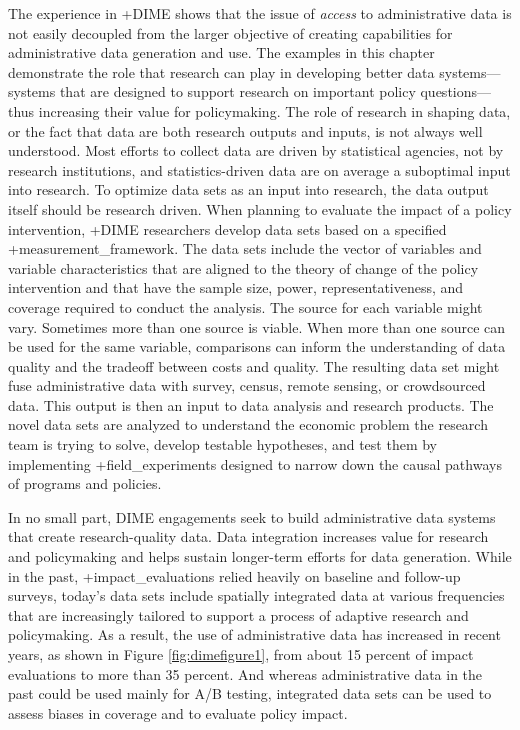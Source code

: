 \documentclass[
]{WileySix}
\begin{document}
The experience in +DIME\textbar{} shows that the issue of \emph{access} to administrative data is not easily decoupled from the larger objective of creating capabilities for administrative data generation and use. The examples in this chapter demonstrate the role that research can play in developing better data systems---systems that are designed to support research on important policy questions---thus increasing their value for policymaking. The role of research in shaping data, or the fact that data are both research outputs and inputs, is not always well understood. Most efforts to collect data are driven by statistical agencies, not by research institutions, and statistics-driven data are on average a suboptimal input into research. To optimize data sets as an input into research, the data output itself should be research driven. When planning to evaluate the impact of a policy intervention, +DIME\textbar{} researchers develop data sets based on a specified +measurement\_framework\textbar. The data sets include the vector of variables and variable characteristics that are aligned to the theory of change of the policy intervention and that have the sample size, power, representativeness, and coverage required to conduct the analysis. The source for each variable might vary. Sometimes more than one source is viable. When more than one source can be used for the same variable, comparisons can inform the understanding of data quality and the tradeoff between costs and quality. The resulting data set might fuse administrative data with survey, census, remote sensing, or crowdsourced data. This output is then an input to data analysis and research products. The novel data sets are analyzed to understand the economic problem the research team is trying to solve, develop testable hypotheses, and test them by implementing +field\_experiments\textbar{} designed to narrow down the causal pathways of programs and policies.

In no small part, DIME engagements seek to build administrative data systems that create research-quality data. Data integration increases value for research and policymaking and helps sustain longer-term efforts for data generation. While in the past, +impact\_evaluations\textbar{} relied heavily on baseline and follow-up surveys, today's data sets include spatially integrated data at various frequencies that are increasingly tailored to support a process of adaptive research and policymaking. As a result, the use of administrative data has increased in recent years, as shown in Figure \ref{fig:dimefigure1}, from about 15 percent of impact evaluations to more than 35 percent. And whereas administrative data in the past could be used mainly for A/B testing, integrated data sets can be used to assess biases in coverage and to evaluate policy impact.
\end{document}
